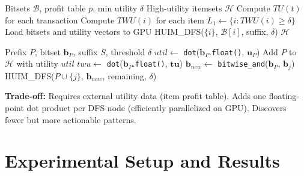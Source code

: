 \documentclass[conference]{IEEEtran}
\begin{document}
\begin{algorithm}[htbp]
\caption{HUIM Extension for Tensor-Eclat}
\label{alg:huim}
\begin{algorithmic}[1]
\REQUIRE Bitsets $\mathcal{B}$, profit table $p$, min utility $\delta$
\ENSURE High-utility itemsets $\mathcal{H}$
\STATE Compute $TU(t)$ for each transaction
\STATE Compute $TWU(i)$ for each item
\STATE $L_1 \leftarrow \{i : TWU(i) \geq \delta\}$ 
\STATE Load bitsets and utility vectors to GPU
    \STATE \textsc{HUIM\_DFS}($\{i\}$, $\mathcal{B}[i]$, suffix, $\delta$)
\ENDFOR
\RETURN $\mathcal{H}$
\end{algorithmic}
\end{algorithm}

\begin{algorithm}[htbp]
\caption{HUIM\_DFS: Utility-Aware DFS on GPU}
\label{alg:huim_dfs}
\begin{algorithmic}[1]
\REQUIRE Prefix $P$, bitset $\mathbf{b}_P$, suffix $S$, threshold $\delta$
\STATE $util \leftarrow$ \texttt{dot}($\mathbf{b}_P$.\texttt{float()}, $\mathbf{u}_P$) 
    \STATE Add $P$ to $\mathcal{H}$ with utility $util$
\ENDIF
\STATE $twu \leftarrow$ \texttt{dot}($\mathbf{b}_P$.\texttt{float()}, $\mathbf{tu}$) 
    \RETURN {}
\ENDIF
{}
    \STATE $\mathbf{b}_{new} \leftarrow$ \texttt{bitwise\_and}($\mathbf{b}_P$, $\mathbf{b}_j$) 
    \STATE \textsc{HUIM\_DFS}($P \cup \{j\}$, $\mathbf{b}_{new}$, remaining, $\delta$)
\ENDFOR
\end{algorithmic}
\end{algorithm}

\textbf{Trade-off:} Requires external utility data (item profit table). Adds one floating-point dot product per DFS node (efficiently parallelized on GPU). Discovers fewer but more actionable patterns.

\section{Experimental Setup and Results}
\end{document}
